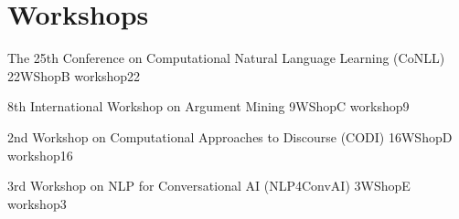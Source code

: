 \chapter[Workshops: \daydate]{Workshops}
\thispagestyle{emptyheader}
\vfill




\clearpage
{}


      \begin{wsschedule}
      {The 25th Conference on Computational Natural Language Learning (CoNLL)}
      {22}{WShopB}
      {workshop22}
      {\WShopLocB}
      
      \end{wsschedule}


      \begin{wsschedule}
      {8th International Workshop on Argument Mining}
      {9}{WShopC}
      {workshop9}
      {\WShopLocB}
      
      \end{wsschedule}

      \begin{wsschedule}
      {2nd Workshop on Computational Approaches to Discourse (CODI)}
      {16}{WShopD}
      {workshop16}
      {\WShopLocB}
      
      \end{wsschedule}





\begin{wsschedule}
  {3rd Workshop on NLP for Conversational AI (NLP4ConvAI)}
  {3}{WShopE}
  {workshop3}
  {\WShopLocB}
  
\end{wsschedule}

